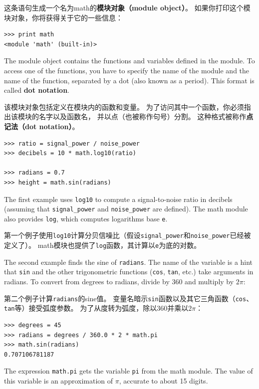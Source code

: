 \documentclass[10pt]{book}
\begin{document}
\begin{CJK}{UTF8}{gbsn}
这条语句生成一个名为math的{\bf 模块对象（module object）}。
如果你打印这个模块对象，你将获得关于它的一些信息：

\begin{verbatim}
>>> print math
<module 'math' (built-in)>
\end{verbatim}
%
The module object contains the functions and variables defined in the
module.  To access one of the functions, you have to specify the name
of the module and the name of the function, separated by a dot (also
known as a period).  This format is called {\bf dot notation}.

该模块对象包括定义在模块内的函数和变量。
为了访问其中一个函数，你必须指出该模块的名字以及函数名，
并以点（也被称作句号）分割。
这种格式被称作{\bf 点记法（dot notation）}。

\begin{verbatim}
>>> ratio = signal_power / noise_power
>>> decibels = 10 * math.log10(ratio)

>>> radians = 0.7
>>> height = math.sin(radians)
\end{verbatim}
%
The first example uses \verb"log10" to compute 
a signal-to-noise ratio in decibels (assuming that \verb"signal_power" and
\verb"noise_power" are defined).  The math module also provides {\tt log},
which computes logarithms base {\tt e}.

第一个例子使用\verb"log10"计算分贝信噪比（假设\verb"signal_power"和\verb"noise_power"已经被定义了）。
math模块也提供了{\tt log}函数，其计算以{\tt e}为底的对数。

The second example finds the sine of {\tt radians}.  The name of the
variable is a hint that {\tt sin} and the other trigonometric
functions ({\tt cos}, {\tt tan}, etc.)  take arguments in radians. To
convert from degrees to radians, divide by 360 and multiply by
$2 \pi$:

第二个例子计算{\tt radians}的sine值。
变量名暗示{\tt sin}函数以及其它三角函数（{\tt cos}、{\tt tan}等）接受弧度参数。
为了从度转为弧度，除以360并乘以$2 \pi$：

\begin{verbatim}
>>> degrees = 45
>>> radians = degrees / 360.0 * 2 * math.pi
>>> math.sin(radians)
0.707106781187
\end{verbatim}
%
The expression {\tt math.pi} gets the variable {\tt pi} from the math
module.  The value of this variable is an approximation
of $\pi$, accurate to about 15 digits.


\end{CJK}
\end{document}
